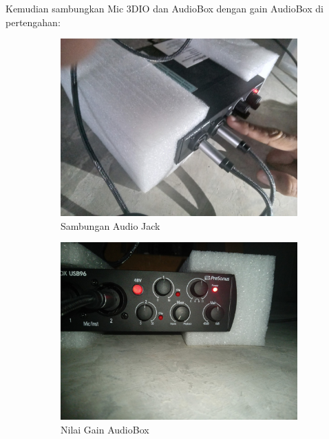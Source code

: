 \documentclass{article}
\begin{document}
	Kemudian sambungkan Mic 3DIO dan AudioBox dengan gain AudioBox di pertengahan:
	
	\begin{figure}[H]
		\centering
		\begin{subfigure}[]{.4\textwidth}
			\includegraphics[width=\textwidth]{images/3dio_presonus_jack}
			\caption{Sambungan Audio Jack}
		\end{subfigure}
		\begin{subfigure}[]{.4\textwidth}
			\includegraphics[width=\textwidth,angle=180]{images/3dio_presonus_set}
			\caption{Nilai Gain AudioBox}
		\end{subfigure}
		\\
		\begin{subfigure}[]{.4\textwidth}

\end{subfigure}
\end{figure}
\end{document}
